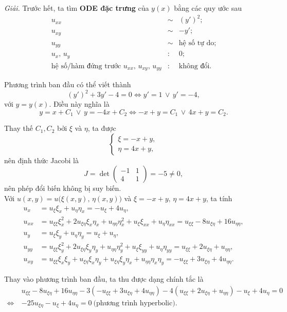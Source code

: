 \documentclass[10pt, a4paper]{article}
\begin{document}
	\textit{Giải.} Trước hết, ta tìm \textbf{\color{red}ODE đặc trưng} của $y(x)$ bằng các quy ước sau $$\begin{array}{lll}
		u_{xx} & \sim & (y')^2;\\
		u_{xy} & \sim & -y';\\
		u_{yy} & \sim & \text{hệ số tự do};\\
		u_x,\,u_y & : & 0;\\
		\text{hệ số/hàm đứng trước }u_{xx},\,u_{xy},\,u_{yy} & : & \text{không đổi}.
	\end{array}$$
	
	Phương trình ban đầu có thể viết thành $$(y')^2+3y'-4=0\iff y'=1\,\lor\,y'=-4,$$
	với $y=y(x)$. Điều này nghĩa là $$y=x+C_1\,\lor\, y=-4x+C_2\iff -x+y=C_1\,\lor\,4x+y=C_2.$$
	
	Thay thế $C_1,C_2$ bởi $\xi$ và $\eta$, ta được $$\begin{cases}
		\xi=-x+y,\\
		\eta=4x+y,
	\end{cases}$$
	nên định thức Jacobi là $$J=\det\begin{pmatrix}
		-1&1\\4&1
	\end{pmatrix}=-5\ne0,$$
	nên phép đổi biến không bị suy biến.\\
	
	Với $u(x,y)=u\big(\xi(x,y),\,\eta(x,y)\big)$ và $\xi=-x+y,\,\eta=4x+y$, ta tính \begin{align*}
		u_x&=u_\xi\xi_x+u_\eta\eta_x=-u_\xi+4u_\eta,\\
		u_{xx}&=u_{\xi\xi}\xi_x^2+2u_{\xi\eta}\xi_x\eta_x+u_{\eta\eta}\eta_x^2+u_\xi\xi_{xx}+u_\eta\eta_{xx}=u_{\xi\xi}-8u_{\xi\eta}+16u_{\eta\eta},\\
		u_y&=u_\xi\xi_y+u_\eta\eta_y=u_\xi+u_\eta,\\
		u_{yy}&=u_{\xi\xi}\xi_y^2+2u_{\xi\eta}\xi_y\eta_y+u_{\eta\eta}\eta_y^2+u_\xi\xi_{yy}+u_\eta\eta_{yy}=u_{\xi\xi}+2u_{\xi\eta}+u_{\eta\eta},\\
		u_{xy}&=u_{\xi\xi}\xi_x\xi_y+u_{\xi\eta}\xi_x\eta_y+u_{\xi\eta}\xi_y\eta_x+u_{\eta\eta}\eta_x\eta_y=-u_{\xi\xi}+3u_{\xi\eta}+4u_{\eta\eta}.
	\end{align*}
	
	Thay vào phương trình ban đầu, ta thu được dạng chính tắc là \begin{align*}
		&u_{\xi\xi}-8u_{\xi\eta}+16u_{\eta\eta}-3(-u_{\xi\xi}+3u_{\xi\eta}+4u_{\eta\eta})-4(u_{\xi\xi}+2u_{\xi\eta}+u_{\eta\eta})-u_\xi+4u_\eta=0\\
		\Leftrightarrow~&-25u_{\xi\eta}-u_\xi+4u_\eta=0~\text{(phương trình hyperbolic)}.
	\end{align*}
	
\end{document}
